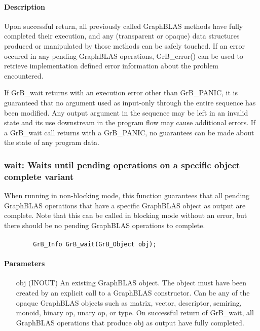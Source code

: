 {\paragraph{Description}

Upon successful return, all previously called GraphBLAS methods have fully
completed their execution, and any (transparent or opaque) data structures
produced or manipulated by those methods can be safely touched.  If an
error occured in any pending GraphBLAS operations, {\sf GrB\_error()}
can be used to retrieve implementation defined error information about
the problem encountered.

If {\sf GrB\_wait} returns with an execution error other than {\sf
GrB\_PANIC}, it is guaranteed that no argument used as input-only
through the entire sequence has been modified.  Any output argument
in the sequence may be left in an invalid state and its use downstream
in the program flow may cause additional errors. If a {\sf GrB\_wait}
call returns with a {\sf GrB\_PANIC}, no guarantees can be made about
the state of any program data.

\subsubsection{{\sf wait}: Waits until pending operations on a specific object complete variant}
\label{Sec:GrB_waitOne}
}

When running in non-blocking mode, this function guarantees that all
pending GraphBLAS operations that have a specific GraphBLAS object as
output are complete.  Note that this can be called in blocking mode
without an error, but there should be no pending GraphBLAS operations
to complete.

\paragraph{\syntax}

\begin{verbatim}
        GrB_Info GrB_wait(GrB_Object obj);
\end{verbatim}

\paragraph{Parameters}

\begin{itemize}[leftmargin=1.1in]
        \item[{\sf obj}] ({\sf INOUT}) An existing GraphBLAS object.
        The object must have been created by an explicit call to a
        GraphBLAS constructor.  Can be any of the opaque GraphBLAS
        objects such as matrix, vector, descriptor, semiring, monoid,
        binary op, unary op, or type. On successful return of {\sf
        GrB\_wait}, all GraphBLAS operations that produce {\sf obj}
        as output have fully completed.
\end{itemize}

